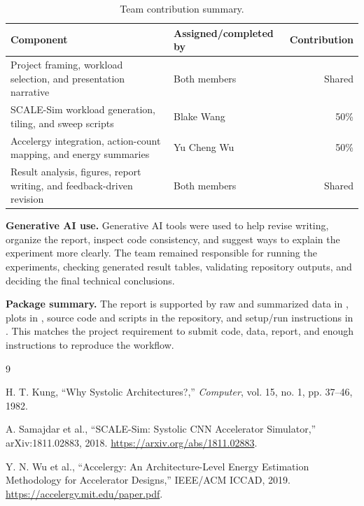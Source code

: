 \documentclass[12pt]{article}
\begin{document}
\begin{table}[H]
\centering
\small
\caption{Team contribution summary.}
\begin{tabularx}{\textwidth}{X l r}
\toprule
Component & Assigned/completed by & Contribution \\
\midrule
Project framing, workload selection, and presentation narrative & Both members & Shared \\
SCALE-Sim workload generation, tiling, and sweep scripts & Blake Wang & 50\% \\
Accelergy integration, action-count mapping, and energy summaries & Yu Cheng Wu & 50\% \\
Result analysis, figures, report writing, and feedback-driven revision & Both members & Shared \\
\bottomrule
\end{tabularx}
\end{table}

\textbf{Generative AI use.} Generative AI tools were used to help revise writing, organize the report, inspect code consistency, and suggest ways to explain the experiment more clearly. The team remained responsible for running the experiments, checking generated result tables, validating repository outputs, and deciding the final technical conclusions.

\textbf{Package summary.} The report is supported by raw and summarized data in , plots in , source code and scripts in the repository, and setup/run instructions in . This matches the project requirement to submit code, data, report, and enough instructions to reproduce the workflow.

\begin{thebibliography}{9}

H. T. Kung, ``Why Systolic Architectures?,'' \emph{Computer}, vol. 15, no. 1, pp. 37--46, 1982.

A. Samajdar et al., ``SCALE-Sim: Systolic CNN Accelerator Simulator,'' arXiv:1811.02883, 2018. \url{https://arxiv.org/abs/1811.02883}.

Y. N. Wu et al., ``Accelergy: An Architecture-Level Energy Estimation Methodology for Accelerator Designs,'' IEEE/ACM ICCAD, 2019. \url{https://accelergy.mit.edu/paper.pdf}.

\end{thebibliography}

\clearpage
\appendix
\end{document}
